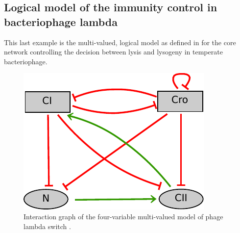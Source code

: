 



\bigskip
\subsection{Logical model of the immunity control in bacteriophage lambda}
\label{sub:ex_phage}
This last example is the multi-valued, logical model as defined in \cite{thieffry95} for the core network controlling the decision between lysis and lysogeny in temperate bacteriophage. 

\begin{figure}[hb]
  \includegraphics{figs/phage_lambda.pdf}
  \caption{Interaction graph of the four-variable multi-valued model of phage lambda switch \cite{thieffry95}.}
  \label{ex-phage}
\end{figure}






